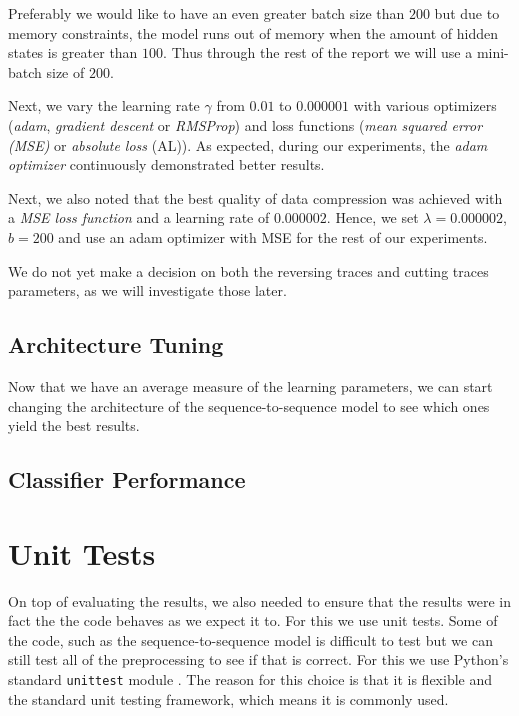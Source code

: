 Preferably we would like to have an even greater batch size than $200$ but due to memory constraints, the model runs out of memory when the amount of hidden states is greater than $100$.
Thus through the rest of the report we will use a mini-batch size of $200$.

Next, we vary the learning rate $\gamma$ from $0.01$ to $0.000001$ with various optimizers (\textit{adam}, \textit{gradient descent} or \textit{RMSProp}) and loss functions (\textit{mean squared error (MSE)} or \textit{absolute loss} (AL)).
As expected, during our experiments, the \textit{adam optimizer} continuously demonstrated better results.

Next, we also noted that the best quality of data compression was achieved with a \textit{MSE loss function} and a learning rate of $0.000002$.
Hence, we set $\lambda = 0.000002$, $b = 200$ and use an adam optimizer with MSE for the rest of our experiments.

We do not yet make a decision on both the reversing traces and cutting traces parameters, as we will investigate those later.

\subsection{Architecture Tuning}

Now that we have an average measure of the learning parameters, we can start changing the architecture of the sequence-to-sequence model to see which ones yield the best results.


\subsection{Classifier Performance}



\section{Unit Tests}

On top of evaluating the results, we also needed to ensure that the results were in fact the the code behaves as we expect it to.
For this we use unit tests.
Some of the code, such as the sequence-to-sequence model is difficult to test but we can still test all of the preprocessing to see if that is correct.
For this we use Python's standard \texttt{unittest} module \cite{python_unittest_documentation}.
The reason for this choice is that it is flexible and the standard unit testing framework, which means it is commonly used.


